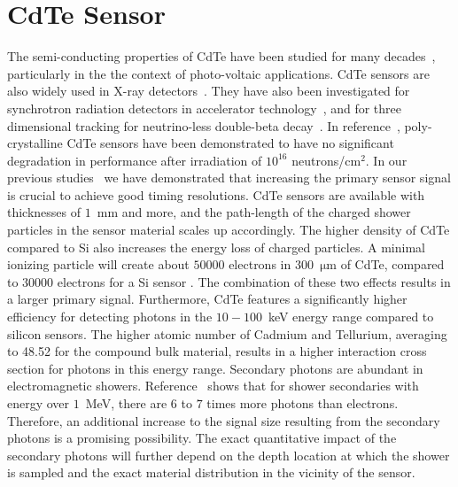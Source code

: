 %
%
%
\section{CdTe Sensor}
\label{sec:siliconpad}
The semi-conducting properties of CdTe have been studied for many decades~\cite{cdtegeneric}, 
particularly in the the context of photo-voltaic applications.
CdTe sensors are also widely used in X-ray detectors~\cite{cdtesensorsgeneric,cdtesensors2,cdtesensors3}. 
They have also been investigated for synchrotron radiation detectors in accelerator 
technology~\cite{cdtelhc}, and for three dimensional tracking for neutrino-less 
double-beta decay~\cite{Filipenko:2014zta}. In reference~\cite{cdtelhc}, poly-crystalline 
CdTe sensors have been demonstrated to have no significant degradation in
performance after irradiation of $10^{16}$ neutrons/$\mathrm{cm}^{2}$. In our previous 
studies~\cite{Anderson:2015gha,MCPShowerMaxPaper,Ronzhin201552,SiliconTiming,PixelatedMCP,Anderson:2016ygg,Anderson:2015tia} 
we have demonstrated that increasing the primary sensor signal is crucial to achieve good timing resolutions.  
CdTe sensors are available with thicknesses of $1$~mm and more, and the path-length of the charged 
shower particles in the sensor material scales up accordingly. The higher density of CdTe compared 
to Si also increases the energy loss of charged particles. 
A minimal ionizing particle will create about $50000$ electrons in 300~$\mathrm{\mu}$m 
of CdTe, compared to $30000$ electrons for a Si sensor \cite{cdtelhc2}.  The combination of these
two effects results in a larger primary signal. Furthermore, CdTe features 
a significantly higher efficiency for detecting photons in the $10-100$~keV energy range 
compared to silicon sensors. The higher atomic number of Cadmium and Tellurium, averaging 
to 48.52 for the compound bulk material, results in a higher interaction cross section for 
photons in this energy range. Secondary photons are abundant in electromagnetic showers. 
Reference~\cite{Beringer:1900zz} shows that for shower secondaries with energy over 
$1$~MeV, there are $6$ to $7$ times more photons than electrons. Therefore, an 
additional increase to the signal size resulting from the secondary photons is a promising 
possibility. The exact quantitative impact of the secondary photons will further depend 
on the depth location at which the shower is sampled and the exact material distribution 
in the vicinity of the sensor. 

